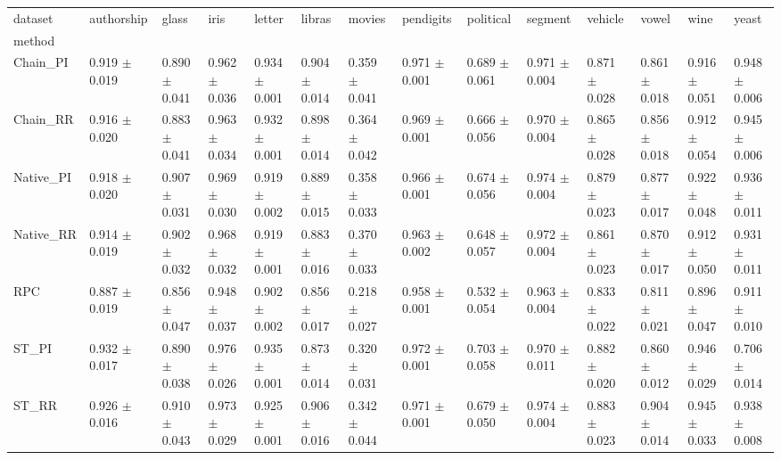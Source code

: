 \begin{tabular}{llllllllllllll}
\toprule
dataset &           authorship &                glass &                 iris &               letter &               libras &               movies &            pendigits &            political &              segment &              vehicle &                vowel &                 wine &                yeast \\
method    &                      &                      &                      &                      &                      &                      &                      &                      &                      &                      &                      &                      &                      \\
\midrule
Chain_PI  &  0.919 $ \pm $ 0.019 &  0.890 $ \pm $ 0.041 &  0.962 $ \pm $ 0.036 &  0.934 $ \pm $ 0.001 &  0.904 $ \pm $ 0.014 &  0.359 $ \pm $ 0.041 &  0.971 $ \pm $ 0.001 &  0.689 $ \pm $ 0.061 &  0.971 $ \pm $ 0.004 &  0.871 $ \pm $ 0.028 &  0.861 $ \pm $ 0.018 &  0.916 $ \pm $ 0.051 &  0.948 $ \pm $ 0.006 \\
Chain_RR  &  0.916 $ \pm $ 0.020 &  0.883 $ \pm $ 0.041 &  0.963 $ \pm $ 0.034 &  0.932 $ \pm $ 0.001 &  0.898 $ \pm $ 0.014 &  0.364 $ \pm $ 0.042 &  0.969 $ \pm $ 0.001 &  0.666 $ \pm $ 0.056 &  0.970 $ \pm $ 0.004 &  0.865 $ \pm $ 0.028 &  0.856 $ \pm $ 0.018 &  0.912 $ \pm $ 0.054 &  0.945 $ \pm $ 0.006 \\
Native_PI &  0.918 $ \pm $ 0.020 &  0.907 $ \pm $ 0.031 &  0.969 $ \pm $ 0.030 &  0.919 $ \pm $ 0.002 &  0.889 $ \pm $ 0.015 &  0.358 $ \pm $ 0.033 &  0.966 $ \pm $ 0.001 &  0.674 $ \pm $ 0.056 &  0.974 $ \pm $ 0.004 &  0.879 $ \pm $ 0.023 &  0.877 $ \pm $ 0.017 &  0.922 $ \pm $ 0.048 &  0.936 $ \pm $ 0.011 \\
Native_RR &  0.914 $ \pm $ 0.019 &  0.902 $ \pm $ 0.032 &  0.968 $ \pm $ 0.032 &  0.919 $ \pm $ 0.001 &  0.883 $ \pm $ 0.016 &  0.370 $ \pm $ 0.033 &  0.963 $ \pm $ 0.002 &  0.648 $ \pm $ 0.057 &  0.972 $ \pm $ 0.004 &  0.861 $ \pm $ 0.023 &  0.870 $ \pm $ 0.017 &  0.912 $ \pm $ 0.050 &  0.931 $ \pm $ 0.011 \\
RPC       &  0.887 $ \pm $ 0.019 &  0.856 $ \pm $ 0.047 &  0.948 $ \pm $ 0.037 &  0.902 $ \pm $ 0.002 &  0.856 $ \pm $ 0.017 &  0.218 $ \pm $ 0.027 &  0.958 $ \pm $ 0.001 &  0.532 $ \pm $ 0.054 &  0.963 $ \pm $ 0.004 &  0.833 $ \pm $ 0.022 &  0.811 $ \pm $ 0.021 &  0.896 $ \pm $ 0.047 &  0.911 $ \pm $ 0.010 \\
ST_PI     &  0.932 $ \pm $ 0.017 &  0.890 $ \pm $ 0.038 &  0.976 $ \pm $ 0.026 &  0.935 $ \pm $ 0.001 &  0.873 $ \pm $ 0.014 &  0.320 $ \pm $ 0.031 &  0.972 $ \pm $ 0.001 &  0.703 $ \pm $ 0.058 &  0.970 $ \pm $ 0.011 &  0.882 $ \pm $ 0.020 &  0.860 $ \pm $ 0.012 &  0.946 $ \pm $ 0.029 &  0.706 $ \pm $ 0.014 \\
ST_RR     &  0.926 $ \pm $ 0.016 &  0.910 $ \pm $ 0.043 &  0.973 $ \pm $ 0.029 &  0.925 $ \pm $ 0.001 &  0.906 $ \pm $ 0.016 &  0.342 $ \pm $ 0.044 &  0.971 $ \pm $ 0.001 &  0.679 $ \pm $ 0.050 &  0.974 $ \pm $ 0.004 &  0.883 $ \pm $ 0.023 &  0.904 $ \pm $ 0.014 &  0.945 $ \pm $ 0.033 &  0.938 $ \pm $ 0.008 \\
\bottomrule
\end{tabular}
